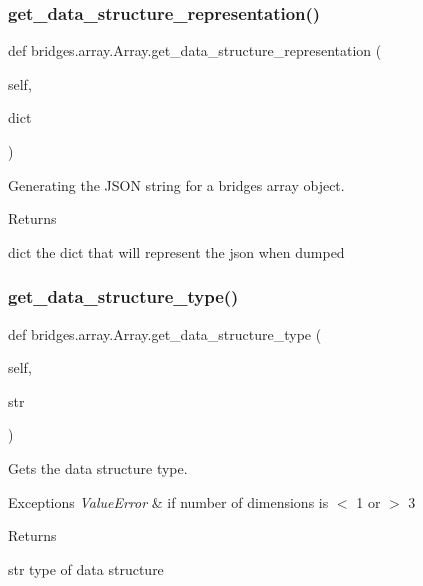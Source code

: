 \subsubsection{\texorpdfstring{get\+\_\+data\+\_\+structure\+\_\+representation()}{get\_data\_structure\_representation()}}
{\footnotesize\ttfamily def bridges.\+array.\+Array.\+get\+\_\+data\+\_\+structure\+\_\+representation (\begin{DoxyParamCaption}\item[{}]{self,  }\item[{}]{dict }\end{DoxyParamCaption})}



Generating the J\+S\+ON string for a bridges array object. 

\begin{DoxyReturn}{Returns}


dict the dict that will represent the json when dumped 
\end{DoxyReturn}
\mbox{\label{classbridges_1_1array_1_1_array_a27dcb7a04798a215092f42506da679ce}} 
\subsubsection{\texorpdfstring{get\+\_\+data\+\_\+structure\+\_\+type()}{get\_data\_structure\_type()}}
{\footnotesize\ttfamily def bridges.\+array.\+Array.\+get\+\_\+data\+\_\+structure\+\_\+type (\begin{DoxyParamCaption}\item[{}]{self,  }\item[{}]{str }\end{DoxyParamCaption})}



Gets the data structure type. 


\begin{DoxyExceptions}{Exceptions}
{\em Value\+Error} & if number of dimensions is $<$ 1 or $>$ 3 \\
\hline
\end{DoxyExceptions}
\begin{DoxyReturn}{Returns}


str type of data structure 
\end{DoxyReturn}
\mbox{\label{classbridges_1_1array_1_1_array_ae224fa7fe9363e2d47231e36638b500f}} 
